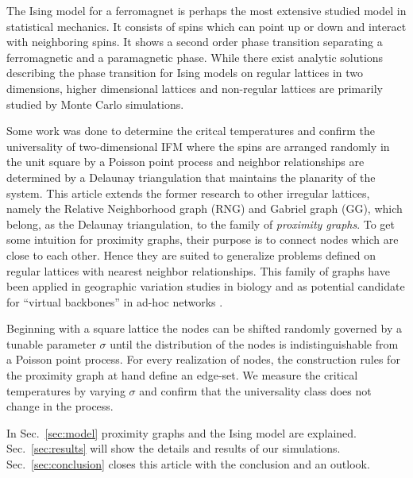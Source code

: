 The Ising model for a ferromagnet \cite{Ising1925} is perhaps the
most extensive studied model in statistical mechanics. It consists
of spins which can point up or down and interact with neighboring
spins. It shows a second order phase transition separating a
ferromagnetic and a paramagnetic phase. While there exist analytic
solutions\cite{Onsager1944,Wannier1945} describing the phase
transition for Ising models on regular lattices in two dimensions,
higher dimensional lattices and non-regular lattices are primarily studied
by Monte Carlo simulations.

Some work \cite{Janke1994,Lima2000,Lima2008} was done to determine
the critcal temperatures and confirm the universality of two-dimensional IFM
where the spins are arranged randomly in the unit square by a
Poisson point process and neighbor relationships are determined by a
Delaunay triangulation that maintains the planarity of the system.
This article extends the former research to other
irregular lattices, namely the Relative Neighborhood graph (RNG) and
Gabriel graph (GG), which belong, as the Delaunay triangulation, to the
family of \emph{proximity graphs}. To get some intuition for proximity
graphs, their purpose is to connect nodes which are close to each other.
Hence they are suited to generalize problems defined on regular lattices
with nearest neighbor relationships.
This family of graphs have been applied in geographic variation studies in
biology \cite{Sokal1978,Sokal1980,Selander1975} and as potential candidate for ``virtual backbones'' in ad-hoc
networks \cite{Kuhn2003,Bose2001,Santi2005,Karp2000,jennings2002topology}. %

Beginning with a square lattice the nodes can be shifted randomly governed
by a tunable parameter $\sigma$ until the distribution of the nodes is
indistinguishable from a Poisson point process.
For every realization of nodes, the construction rules for the proximity
graph at hand define an edge-set.
We measure the critical temperatures by varying $\sigma$ and confirm that
the universality class does not change in the process.


In Sec.~\ref{sec:model} proximity graphs and the Ising model
are explained. Sec.~\ref{sec:results} will show the
details and results of our simulations. Sec.~\ref{sec:conclusion}
closes this article with the conclusion and an outlook.
